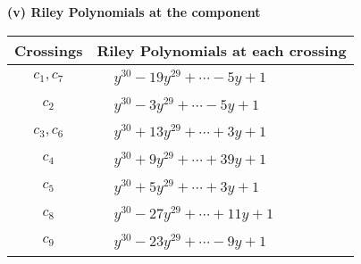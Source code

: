 \documentclass[1p]{elsarticle_modified}
\theoremstyle{definition}
\begin{document}
\newpage\renewcommand{\arraystretch}{1}
\flushleft \textbf{(v) Riley Polynomials at the component}\newline \\
\begin{tabular}{m{50pt}|m{274pt}}
Crossings & \hspace{64pt}Riley Polynomials at each crossing \\
\hline $$\begin{aligned}c_{1},c_{7}\end{aligned}$$&$\begin{aligned}
&y^{30}-19 y^{29}+\cdots-5 y+1
\end{aligned}$\\
\hline $$\begin{aligned}c_{2}\end{aligned}$$&$\begin{aligned}
&y^{30}-3 y^{29}+\cdots-5 y+1
\end{aligned}$\\
\hline $$\begin{aligned}c_{3},c_{6}\end{aligned}$$&$\begin{aligned}
&y^{30}+13 y^{29}+\cdots+3 y+1
\end{aligned}$\\
\hline $$\begin{aligned}c_{4}\end{aligned}$$&$\begin{aligned}
&y^{30}+9 y^{29}+\cdots+39 y+1
\end{aligned}$\\
\hline $$\begin{aligned}c_{5}\end{aligned}$$&$\begin{aligned}
&y^{30}+5 y^{29}+\cdots+3 y+1
\end{aligned}$\\
\hline $$\begin{aligned}c_{8}\end{aligned}$$&$\begin{aligned}
&y^{30}-27 y^{29}+\cdots+11 y+1
\end{aligned}$\\
\hline $$\begin{aligned}c_{9}\end{aligned}$$&$\begin{aligned}
&y^{30}-23 y^{29}+\cdots-9 y+1
\end{aligned}$\\
\hline
\end{tabular}\\~\\
\end{document}
